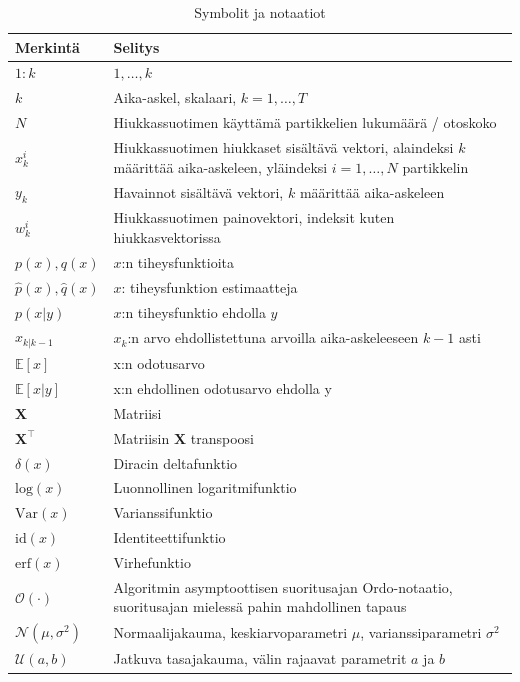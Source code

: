 \documentclass[
  12pt,
  a4paper, twoside]{book}
\begin{document}
\begin{table}

\caption{\label{tab:notaatiot}Symbolit ja notaatiot}
\centering
\begin{tabular}[t]{ll}
\toprule
Merkintä & Selitys\\
\midrule
$1:k$ & $1,\ldots,k$\\
$k$ & Aika-askel, skalaari, $k={1,\ldots,T}$\\
$N$ & Hiukkassuotimen käyttämä partikkelien lukumäärä / otoskoko\\
$x^i_k$ & \makecell[l]{Hiukkassuotimen hiukkaset sisältävä vektori,\\alaindeksi $k$ määrittää aika-askeleen,\\yläindeksi $i={1,\ldots,N}$ partikkelin}\\
$y_k$ & Havainnot sisältävä vektori, $k$ määrittää aika-askeleen\\
\addlinespace
$w^i_k$ & Hiukkassuotimen painovektori, indeksit kuten hiukkasvektorissa\\
$p(x), q(x)$ & $x$:n tiheysfunktioita\\
$\hat{p}(x), \hat{q}(x)$ & $x$: tiheysfunktion estimaatteja\\
$p(x|y)$ & $x$:n tiheysfunktio ehdolla $y$\\
$x_{k|k-1}$ & $x_k$:n arvo ehdollistettuna arvoilla aika-askeleeseen $k-1$ asti\\
\addlinespace
$\mathbb{E}[x]$ & x:n odotusarvo\\
$\mathbb{E}[x|y]$ & x:n ehdollinen odotusarvo ehdolla y\\
$\mathbf{X}$ & Matriisi\\
$\mathbf{X}^\top$ & Matriisin $\mathbf{X}$ transpoosi\\
$\delta(x)$ & Diracin deltafunktio\\
\addlinespace
$\text{log}(x)$ & Luonnollinen logaritmifunktio\\
$\text{Var}(x)$ & Varianssifunktio\\
$\text{id}(x)$ & Identiteettifunktio\\
$\text{erf}(x)$ & Virhefunktio\\
$\mathcal{O}(\cdot)$ & \makecell[l]{Algoritmin asymptoottisen suoritusajan Ordo-notaatio,\\suoritusajan mielessä pahin mahdollinen tapaus}\\
\addlinespace
$\mathcal{N}(\mu, \sigma^2)$ & Normaalijakauma, keskiarvoparametri $\mu$, varianssiparametri $\sigma^2$\\
$\mathcal{U}(a, b)$ & Jatkuva tasajakauma, välin rajaavat parametrit $a$ ja $b$\\

\end{tabular}
\end{table}
\end{document}
